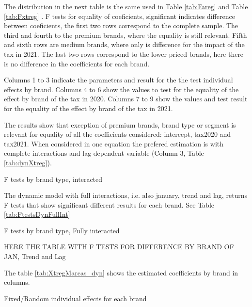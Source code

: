 \documentclass[]{article}
\begin{document}
The distribution in the next table is the same used in Table \ref{tab:Fareg} and Table \ref{tab:Fxtreg} . F tests for equality of coeficients, significant indicates difference between coeficients, the first two rows correspond to the complete sample. The third and fourth to the premium brands, where the equality is still relevant. Fifth and sixth rows are medium brands, where only is difference for the impact of the tax in 2021. The last two rows correspond to the lower priced brands, here there is no difference in the coefficients for each brand.

Columns 1 to 3 indicate the parameters and result for the the test individual effects by brand. Columns 4 to 6 show the values to test for the equality of the effect by brand of the tax in 2020. Columns 7 to 9 show the values and test result for the equality of the effect by brand of the tax in 2021.
 
The results show that exception of premium brands, brand type or segment is relevant for equality of all the coefficients considered: intercept, tax2020 and tax2021. When considered in one equation the prefered estimation is with complete interactions and lag dependent variable (Column 3, Table \ref{tab:dynXtreg}).
 
\begin{landscape}
\begin{table}[ht]
	\centering
	\caption{F tests by brand type, interacted \label{tab:FtestsDyn}} 
	
\end{table}
\end{landscape}
 
The dynamic model with full interactions, i.e. also january, trend and lag, returns F tests that show significant different results for each brand. See Table \ref{tab:FtestsDynFullInt} 

\begin{landscape}
	\begin{table}[ht]
		\centering
		\caption{F tests by brand type, Fully interacted \label{tab:FtestsDynFullInt}} 
HERE THE TABLE WITH F TESTS FOR DIFFERENCE BY BRAND OF JAN, Trend and Lag 	\end{table}
\end{landscape}

The table \ref{tab:XtregMarcas_dyn} shows the estimated coefficients by brand in columns.

\begin{landscape}
	\begin{table}[ht]
		\centering
		\caption{Fixed/Random individual effects for each brand \label{tab:XtregMarcas_dyn}}
		
	\end{table}
\end{landscape}
 
\end{document}
